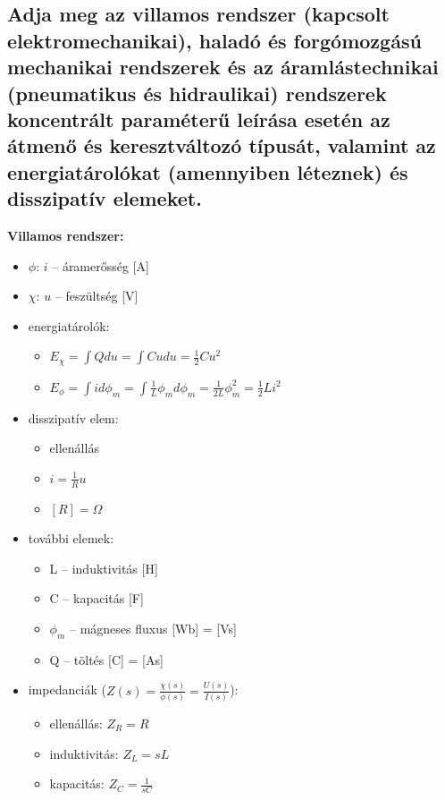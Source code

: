 \subsection{Adja meg az villamos rendszer (kapcsolt elektromechanikai), haladó és forgómozgású mechanikai rendszerek és az áramlástechnikai (pneumatikus és hidraulikai) rendszerek koncentrált paraméterű leírása esetén az átmenő és keresztváltozó típusát, valamint az energiatárolókat (amennyiben léteznek) és disszipatív elemeket.}

\noindent \textbf{Villamos rendszer:}
\begin{itemize}
    \item $\phi$: $i$ -- áramerősség [A]
    \item $\chi$: $u$ -- feszültség [V]
    \item energiatárolók:
    \begin{itemize}
        \item[] $ E_\chi = \int Q du = \int C u du = \frac{1}{2} C u^2 $
        \item[] $ E_\phi = \int i d\phi_m = \int \frac{1}{L} \phi_m d\phi_m = \frac{1}{2L} \phi_m^2 = \frac{1}{2} L i^2 $
    \end{itemize}
    \item disszipatív elem:
    \begin{itemize}
        \item ellenállás
        \item $i = \frac{1}{R} u$
        \item $[R] = \Omega$
    \end{itemize}
    \item további elemek:
    \begin{itemize}
        \item L -- induktivitás [H]
        \item C -- kapacitás [F]
        \item $\phi_m$ -- mágneses fluxus [Wb] = [Vs]
        \item Q -- töltés [C] = [As]
    \end{itemize}
    \item impedanciák ($Z(s) = \frac{\chi(s)}{\phi(s)} = \frac{U(s)}{I(s)}$):
    \begin{itemize}
        \item ellenállás: $Z_R = R$
        \item induktivitás: $Z_L = sL$
        \item kapacitás: $Z_C = \frac{1}{sC}$
    \end{itemize}
\end{itemize}

